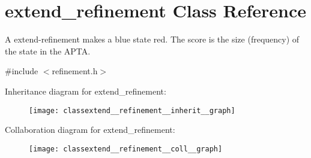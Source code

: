 \hypertarget{classextend__refinement}{}\section{extend\+\_\+refinement Class Reference}
\label{classextend__refinement}


A extend-\/refinement makes a blue state red. The score is the size (frequency) of the state in the A\+P\+TA.  




{\ttfamily \#include $<$refinement.\+h$>$}



Inheritance diagram for extend\+\_\+refinement\+:
\nopagebreak
\begin{figure}[H]
\begin{center}
\leavevmode
\texttt{[image: classextend\_\_refinement\_\_inherit\_\_graph]}
\end{center}
\end{figure}


Collaboration diagram for extend\+\_\+refinement\+:
\nopagebreak
\begin{figure}[H]
\begin{center}
\leavevmode
\texttt{[image: classextend\_\_refinement\_\_coll\_\_graph]}
\end{center}
\end{figure}
